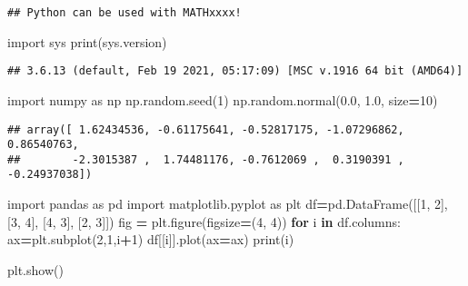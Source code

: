 \documentclass[mstat,12pt]{unswthesis}
\newenvironment{Shaded}{\begin{snugshade}}{\end{snugshade}}
\newcommand{\BuiltInTok}[1]{#1}
\newcommand{\ControlFlowTok}[1]{\textcolor[rgb]{0.13,0.29,0.53}{\textbf{#1}}}
\newcommand{\DecValTok}[1]{\textcolor[rgb]{0.00,0.00,0.81}{#1}}
\newcommand{\FloatTok}[1]{\textcolor[rgb]{0.00,0.00,0.81}{#1}}
\newcommand{\ImportTok}[1]{#1}
\newcommand{\KeywordTok}[1]{\textcolor[rgb]{0.13,0.29,0.53}{\textbf{#1}}}
\newcommand{\NormalTok}[1]{#1}
\newcommand{\OperatorTok}[1]{\textcolor[rgb]{0.81,0.36,0.00}{\textbf{#1}}}
\begin{document}
\begin{verbatim}
## Python can be used with MATHxxxx!
\end{verbatim}

\begin{Shaded}
\begin{Highlighting}[]
\ImportTok{import}\NormalTok{ sys}
\BuiltInTok{print}\NormalTok{(sys.version)}
\end{Highlighting}
\end{Shaded}

\begin{verbatim}
## 3.6.13 (default, Feb 19 2021, 05:17:09) [MSC v.1916 64 bit (AMD64)]
\end{verbatim}

\begin{Shaded}
\begin{Highlighting}[]
\ImportTok{import}\NormalTok{ numpy }\ImportTok{as}\NormalTok{ np}
\NormalTok{np.random.seed(}\DecValTok{1}\NormalTok{)}
\NormalTok{np.random.normal(}\FloatTok{0.0}\NormalTok{, }\FloatTok{1.0}\NormalTok{, size}\OperatorTok{=}\DecValTok{10}\NormalTok{)}
\end{Highlighting}
\end{Shaded}

\begin{verbatim}
## array([ 1.62434536, -0.61175641, -0.52817175, -1.07296862,  0.86540763,
##        -2.3015387 ,  1.74481176, -0.7612069 ,  0.3190391 , -0.24937038])
\end{verbatim}

\begin{Shaded}
\begin{Highlighting}[]
\ImportTok{import}\NormalTok{ pandas }\ImportTok{as}\NormalTok{ pd}
\ImportTok{import}\NormalTok{ matplotlib.pyplot }\ImportTok{as}\NormalTok{ plt}
\NormalTok{df}\OperatorTok{=}\NormalTok{pd.DataFrame([[}\DecValTok{1}\NormalTok{, }\DecValTok{2}\NormalTok{], [}\DecValTok{3}\NormalTok{, }\DecValTok{4}\NormalTok{], [}\DecValTok{4}\NormalTok{, }\DecValTok{3}\NormalTok{], [}\DecValTok{2}\NormalTok{, }\DecValTok{3}\NormalTok{]])}
\NormalTok{fig }\OperatorTok{=}\NormalTok{ plt.figure(figsize}\OperatorTok{=}\NormalTok{(}\DecValTok{4}\NormalTok{, }\DecValTok{4}\NormalTok{))}
\ControlFlowTok{for}\NormalTok{ i }\KeywordTok{in}\NormalTok{ df.columns:}
\NormalTok{    ax}\OperatorTok{=}\NormalTok{plt.subplot(}\DecValTok{2}\NormalTok{,}\DecValTok{1}\NormalTok{,i}\OperatorTok{+}\DecValTok{1}\NormalTok{) }
\NormalTok{    df[[i]].plot(ax}\OperatorTok{=}\NormalTok{ax)}
    \BuiltInTok{print}\NormalTok{(i)}

\NormalTok{plt.show()}
\end{Highlighting}
\end{Shaded}
\end{document}

